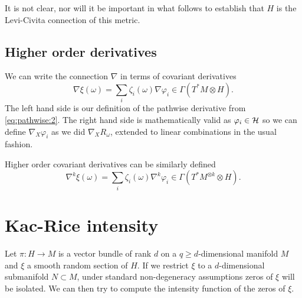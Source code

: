\documentclass{article}
\newcommand{\randsec}{\xi}
\begin{document}
\begin{eqaution}
It is not clear, nor will it be important in what follows to establish that $H$ is the Levi-Civita
connection of this metric.

\subsection{Higher order derivatives}

We can write the connection $\nabla$ in terms of covariant derivatives
$$
{\nabla} \randsec(\omega) = \sum_i \zeta_i(\omega) \nabla \varphi_i \in \Gamma(T^*M \otimes H).
$$
The left hand side is our definition of the pathwise derivative from \eqref{eq:pathwise:2}.  The right
hand side is mathematically valid as $\varphi_i \in {\cal H}$ so we can define $\nabla_X \varphi_i$ as we did
$\nabla_XR_{\omega}$, extended to linear combinations in the usual fashion.

Higher order covariant derivatives can be similarly defined
$$
\nabla^k \randsec(\omega) = \sum_i \zeta_i(\omega) \nabla^k \varphi_i \in \Gamma(T^*M^{\otimes k} \otimes H).
$$

\section{Kac-Rice intensity}

\newcommand{\coordchart}{\mathfrak{t}}

Let $\pi:H \to M$ is a vector bundle of rank $d$ on a $q \geq d$-dimensional manifold $M$ and $\randsec$
a smooth random section of $H$. If we restrict $\randsec$ to a $d$-dimensional
submanifold $N \subset M$, under standard non-degeneracy assumptions zeros of $\randsec$ will be isolated.
We can then try to compute the intensity function of the zeros of $\randsec$.


\end{eqaution}
\end{document}
